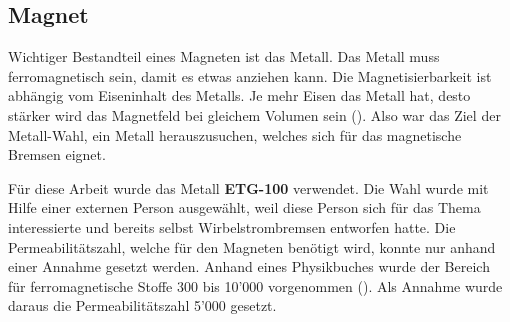 \subsection{Magnet}
Wichtiger Bestandteil eines Magneten ist das Metall. Das Metall muss ferromagnetisch sein, damit es etwas anziehen kann. Die Magnetisierbarkeit ist abhängig vom Eiseninhalt des Metalls. Je mehr Eisen das Metall hat, desto stärker wird das Magnetfeld bei gleichem Volumen sein (\cite{schulmaterial_magnetismus}). Also war das Ziel der Metall-Wahl, ein Metall herauszusuchen, welches sich für das magnetische Bremsen eignet.
\newpara

\newpara
Für diese Arbeit wurde das Metall \textbf{ETG-100} verwendet. Die Wahl wurde mit Hilfe einer externen Person ausgewählt, weil diese Person sich für das Thema interessierte und bereits selbst Wirbelstrombremsen entworfen hatte.
\newpara
Die Permeabilitätszahl, welche für den Magneten benötigt wird, konnte nur anhand einer Annahme gesetzt werden. Anhand eines Physikbuches wurde der Bereich für ferromagnetische Stoffe 300 bis 10'000 vorgenommen (\cite[S.661]{kuchling2014taschenbuch}). Als Annahme wurde daraus die Permeabilitätszahl 5'000 gesetzt.
